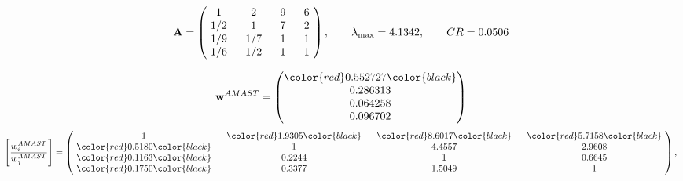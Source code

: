\begin{example}
\begin{equation*}
\mathbf{A} =
\begin{pmatrix}
$\,\,$ 1 $\,\,$ & $\,\,$2$\,\,$ & $\,\,$9$\,\,$ & $\,\,$6 $\,\,$ \\
$\,\,$ 1/2$\,\,$ & $\,\,$ 1 $\,\,$ & $\,\,$7$\,\,$ & $\,\,$2 $\,\,$ \\
$\,\,$ 1/9$\,\,$ & $\,\,$ 1/7$\,\,$ & $\,\,$ 1 $\,\,$ & $\,\,$1 $\,\,$ \\
$\,\,$ 1/6$\,\,$ & $\,\,$ 1/2$\,\,$ & $\,\,$ 1 $\,\,$ & $\,\,$ 1  $\,\,$ \\
\end{pmatrix},
\qquad
\lambda_{\max} =
4.1342,
\qquad
CR = 0.0506
\end{equation*}

\begin{equation*}
\mathbf{w}^{AMAST} =
\begin{pmatrix}
\color{red} 0.552727\color{black} \\
0.286313\\
0.064258\\
0.096702
\end{pmatrix}\end{equation*}
\begin{equation*}
\left[ \frac{{w}^{AMAST}_i}{{w}^{AMAST}_j} \right] =
\begin{pmatrix}
$\,\,$ 1 $\,\,$ & $\,\,$\color{red} 1.9305\color{black} $\,\,$ & $\,\,$\color{red} 8.6017\color{black} $\,\,$ & $\,\,$\color{red} 5.7158\color{black} $\,\,$ \\
$\,\,$\color{red} 0.5180\color{black} $\,\,$ & $\,\,$ 1 $\,\,$ & $\,\,$4.4557$\,\,$ & $\,\,$2.9608  $\,\,$ \\
$\,\,$\color{red} 0.1163\color{black} $\,\,$ & $\,\,$0.2244$\,\,$ & $\,\,$ 1 $\,\,$ & $\,\,$0.6645 $\,\,$ \\
$\,\,$\color{red} 0.1750\color{black} $\,\,$ & $\,\,$0.3377$\,\,$ & $\,\,$1.5049$\,\,$ & $\,\,$ 1  $\,\,$ \\
\end{pmatrix},
\end{equation*}


\end{example}
